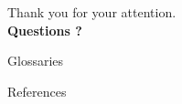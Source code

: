 \documentclass[18pt]{beamer}
\begin{document}
\begin{frame}
\vfill
\centering
{\LARGE Thank you for your attention.}\\
\vspace{1cm}
{\Large \textbf{Questions ?}}
\vfill
\end{frame}

\appendix
\beginbackup

\nocite{*}

\begin{frame}[allowframebreaks]{Glossaries}
\printglossaries
\end{frame}

\begin{frame}[allowframebreaks]{References}
\printbibliography
\end{frame}

\backupend
\end{document}

